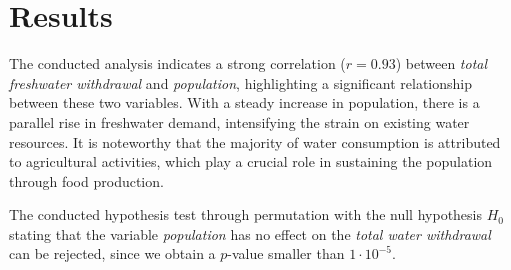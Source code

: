 \documentclass{article}
\theoremstyle{plain}
\theoremstyle{definition}
\theoremstyle{remark}
\begin{document}
\section{Results}
\label{sec:results}
The conducted analysis indicates a strong correlation ($r = 0.93$) between \textit{total freshwater withdrawal} and \textit{population}, highlighting a significant relationship between these two variables. With a steady increase in population, there is a parallel rise in freshwater demand, intensifying the strain on existing water resources. It is noteworthy that the majority of water consumption is attributed to agricultural activities, which play a crucial role in sustaining the population through food production.

The conducted hypothesis test through permutation with the null hypothesis $H_0$ stating that the variable \textit{population} has no effect on the \textit{total water withdrawal} can be rejected, since we obtain a $p$-value smaller than $1\cdot10^{-5}$.
\end{document}
